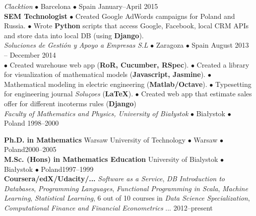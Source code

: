 \documentclass[a4paper, twoside]{scrreprt}
\begin{document}
{\noindent{}\textit{Clacktion} $\bullet$ Barcelona $\bullet$ Spain \hfill January--April 2015\\
\noindent\textbf{\small SEM Technologist} $\bullet$
{\small Created Google AdWords campaigns for Poland and
  Russia. $\bullet$ Wrote \textbf{Python} scripts that access Google,
  Facebook, local CRM APIs and store
  data into local DB (using \textbf{Django}).}\\

\noindent{}\textit{Soluciones de Gestión y Apoyo a Empresas S.L} 
$\bullet$ Zaragoza $\bullet$ Spain \hfill August 2013 -- December 2014\\
 $\bullet$
{\small Created warehouse web app (\textbf{RoR, Cucumber,
    RSpec}).} $\bullet$ 
{\small Created a library for visualization of
  mathematical models (\textbf{Javascript, Jasmine}).} $\bullet$
{\small Mathematical modeling in electric engineering
  (\textbf{Matlab/Octave}).} $\bullet$ 
{\small Typesetting for engineering
  journal \emph{Soluçoes} (\textbf{\LaTeX}).} $\bullet$ 
{\small Created web app that estimate sales offer for different incoterms
  rules (\textbf{Django})}
\\

\noindent{}\textit{Faculty of Mathematics and Physics, University of Bia{\l}ystok} $\bullet$  Bia{\l}ystok $\bullet$ Poland \hfill 1998--2000\\ 

\noindent\makebox[\linewidth]{\rule{\textwidth}{0.4pt}}

\vspace{0.2cm}
\noindent\textbf{Ph.D. in Mathematics} Warsaw University of Technology $\bullet$ Warsaw $\bullet$ Poland\hfill 2000--2005\\
\noindent\textbf{M.Sc. (Hons) in Mathematics Education} University of Bialystok $\bullet$ Białystok $\bullet$ Poland\hfill 1997--1999\\
\noindent\textbf{Coursera/edX/Udacity/...} \emph{Software as a Service}, \emph{DB Introduction to Databases},  \emph{Programming Languages}, \emph{Functional Programming in Scala}, \emph{Machine Learning}, \emph{Statistical Learning}, 6 out of 10 courses in \emph{Data Science Specialization}, \emph{Computational Finance and Financial Econometrics} ... \hfill 2012--present

}
\end{document}
